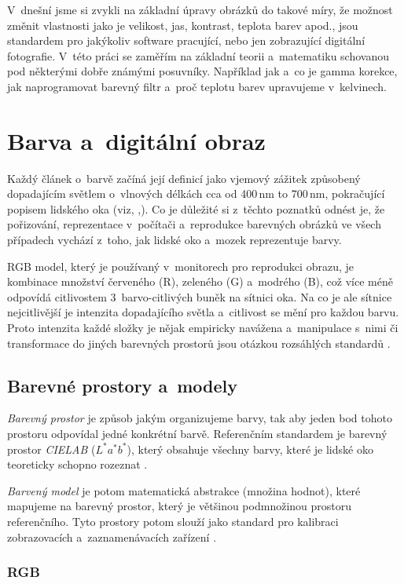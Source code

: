 \documentclass[11pt, a4paper, titlepage]{article}
\begin{document}
V~dnešní jsme si zvykli na základní úpravy obrázků do takové míry, že možnost změnit vlastnosti jako je velikost, jas, kontrast, teplota barev apod., jsou standardem pro jakýkoliv software pracující, nebo jen zobrazující digitální fotografie.
V~této práci se zaměřím na základní teorii a~matematiku schovanou pod některými dobře známými posuvníky.
Například jak a~co je gamma korekce, jak naprogramovat barevný filtr a~proč teplotu barev upravujeme v~kelvinech.

\section{Barva a~digitální obraz}
Každý článek o~barvě začíná její definicí jako vjemový zážitek způsobený dopadajícím světlem o~vlnových délkách cca od 400\,nm to 700\,nm, pokračující popisem lidského oka (viz, \cite{wiki:Color},\cite{mul_opora}).
Co je důležité si z~těchto poznatků odnést je, že pořizování, reprezentace v~počítači a~reprodukce barevných obrázků ve všech případech vychází z~toho, jak lidské oko a~mozek reprezentuje barvy.

RGB model, který je používaný v~monitorech pro reprodukci obrazu, je kombinace množství červeného (R), zeleného (G) a~modrého (B), což více méně odpovídá citlivostem 3~barvo-citlivých buněk na sítnici oka.
Na co je ale sítnice nejcitlivější je intenzita dopadajícího světla a~citlivost se mění pro každou barvu.
Proto intenzita každé složky je nějak empiricky navážena a~manipulace s~nimi či transformace do jiných barevných prostorů jsou otázkou rozsáhlých standardů \cite{wiki:Color_space}.
   
\subsection{Barevné prostory a~modely} \label{color_spaces}
\emph{Barevný prostor} je způsob jakým organizujeme barvy, tak aby jeden bod tohoto prostoru odpovídal jedné konkrétní barvě.
Referenčním standardem je barevný prostor \emph{CIELAB} ($L^*a^*b^*$), který obsahuje všechny barvy, které je lidské oko teoreticky schopno rozeznat \cite{wiki:CIELAB_color_space}.

\emph{Barvený model} je potom matematická abstrakce (množina hodnot), které mapujeme na barevný prostor, který je většinou podmnožinou prostoru referenčního.
Tyto prostory potom slouží jako standard pro kalibraci zobrazovacích a~zaznamenávacích zařízení \cite{wiki:Color_space}.

\subsubsection{RGB}
\end{document}
